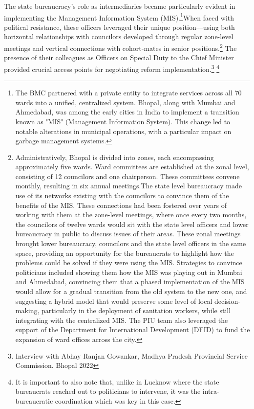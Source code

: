 The state bureaucracy's role as intermediaries became particularly evident in implementing the Management Information System (MIS).\footnote{The BMC partnered with a private entity to integrate services across all 70 wards into a unified, centralized system. Bhopal, along with Mumbai and Ahmedabad, was among the early cities in India to implement a transition known as "MIS" (Management Information System). This change led to notable alterations in municipal operations, with a particular impact on garbage management systems.}When faced with political resistance, these officers leveraged their unique position—using both horizontal relationships with councilors developed through regular zone-level meetings and vertical connections with cohort-mates in senior positions.\footnote{Administratively, Bhopal is divided into zones, each encompassing approximately five wards. Ward committees are established at the zonal level, consisting of 12 councilors and one chairperson. These committees convene monthly, resulting in six annual meetings.The state level  bureaucracy made use of its networks existing with the councilors to convince them of the benefits of the MIS. These connections had been fostered over years of working with them at the zone-level meetings, where once every two months, the councilors of twelve wards would sit with the state level officers and lower bureaucracy in public to discuss issues of their areas. These zonal meetings brought lower bureaucracy, councilors and the state level  officers in the same space, providing an opportunity for the bureaucrats to highlight how the problems could be solved if they were using the MIS. 
Strategies to convince politicians included showing them how the MIS was playing out in Mumbai and Ahmedabad, convincing them that a phased implementation of the MIS would allow for a gradual transition from the old system to the new one, and suggesting a hybrid model that would preserve some level of local decision-making, particularly in the deployment of sanitation workers, while still integrating with the centralized MIS. The PIU team also leveraged the support of the Department for International Development (DFID) to fund the expansion of ward offices across the city. 
} The presence of their colleagues as Officers on Special Duty to the Chief Minister provided crucial access points for negotiating reform implementation.\footnote{Interview with Abhay Ranjan Gowankar, Madhya Pradesh Provincial Service Commission. Bhopal 2022
} \footnote{It is important to also note that, unlike in Lucknow where the state  bureaucrats reached out to politicians to intervene, it was the intra-bureaucratic coordination which was key in this case.
}


